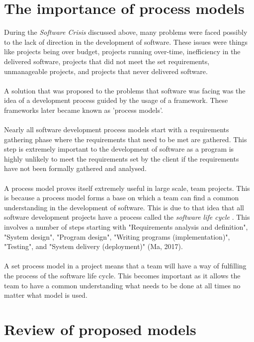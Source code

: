 \documentclass{CRPITStyle}
\begin{document}
	\section {The importance of process models}
		During the \textit {Software Crisis} discussed above, many problems were faced possibly to the lack of direction in the
		development of software. These issues were things like projects being over budget, projects running over-time,
		inefficiency in the delivered software, projects that did not meet the set requirements, unmanageable projects, and
		projects that never delivered software. \\
		~\\
		 A solution that was proposed to the problems that software was facing was the idea
		of a development process guided by the usage of a framework. These frameworks later became known as 'process
		models'. \\
		~\\
		Nearly all software development process models start with a requirements gathering phase where the requirements that
		need to be met are gathered. This step is extremely important to the development of software as a program is highly
		unlikely to meet the requirements set by the client if the requirements have not been formally gathered and analysed.\\
		~\\
		A process model proves itself extremely useful in large scale, team projects. This is because a process model forms a 
		base on which a team can find a common understanding in the development of software. This is due to that idea that all
		software development projects have a process called the \textit{ software life cycle }. This involves a number of steps
		starting with "Requirements analysis and definition", "System design", "Program design", "Writing programs 
		(implementation)", "Testing", and "System delivery (deployment)" (Ma, 2017).\\
		~\\
		A set process model in a project means that a team will have a way of fulfilling the process of the software life cycle.
		This becomes important as it allows the team to have a common understanding what needs to be done at all times no
		matter what model is used. 

	\section {Review of proposed models}
\end{document}
